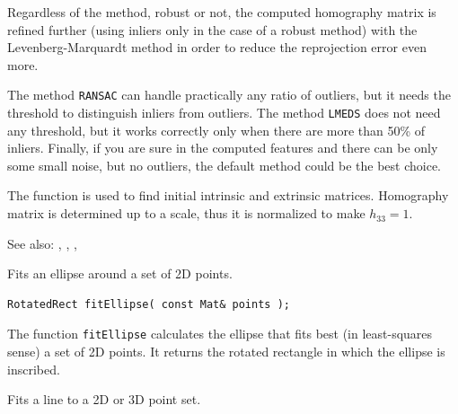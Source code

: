 \begin{description}
Regardless of the method, robust or not, the computed homography
matrix is refined further (using inliers only in the case of a robust
method) with the Levenberg-Marquardt method in order to reduce the
reprojection error even more.

The method \texttt{RANSAC} can handle practically any ratio of outliers,
but it needs the threshold to distinguish inliers from outliers.
The method \texttt{LMEDS} does not need any threshold, but it works
correctly only when there are more than 50\% of inliers. Finally,
if you are sure in the computed features and there can be only some
small noise, but no outliers, the default method could be the best
choice.

The function is used to find initial intrinsic and extrinsic matrices.
Homography matrix is determined up to a scale, thus it is normalized
to make $h_{33} =1$.

See also: , , ,


\label{fitEllipse}
Fits an ellipse around a set of 2D points.

\begin{lstlisting}
RotatedRect fitEllipse( const Mat& points );
\end{lstlisting}
\begin{description}
\end{description}

The function \texttt{fitEllipse} calculates the ellipse that fits best
(in least-squares sense) a set of 2D points. It returns the rotated rectangle in which the ellipse is inscribed.

\label{fitLine}
Fits a line to a 2D or 3D point set.


\end{description}
